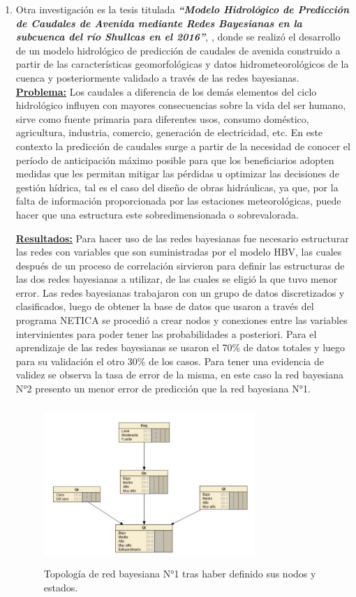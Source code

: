 \documentclass[10pt,conference]{IEEEtran}
\begin{document}
\begin{enumerate}
\item Otra investigación es la tesis titulada \textit{\textbf{“Modelo Hidrológico de Predicción de Caudales de Avenida mediante Redes Bayesianas en la subcuenca del río Shullcas en el 2016”}}, \citep{gonzales2021modelo}, donde se realizó el desarrollo de un modelo hidrológico de predicción
de caudales de avenida construido a partir de las características geomorfológicas y datos hidrometeorológicos de la cuenca y posteriormente validado a través de las redes bayesianas.
\textbf{\underline{Problema:}}
Los caudales a diferencia de los demás elementos del ciclo hidrológico influyen con mayores consecuencias sobre la vida del ser humano, sirve como fuente primaria para diferentes usos, consumo doméstico, agricultura, industria, comercio, generación de electricidad, etc.
En este contexto la predicción de caudales surge a partir de la necesidad de conocer el período de anticipación máximo posible para que los beneficiarios adopten medidas que les permitan mitigar las pérdidas u optimizar las decisiones de gestión hídrica, tal es el caso del diseño de obras hidráulicas, ya que, por la falta de información proporcionada por las estaciones meteorológicas, puede hacer que una estructura este sobredimensionada o sobrevalorada.\par
\textbf{\underline{Resultados:}}
Para hacer uso de las redes bayesianas fue necesario estructurar las redes con variables que son suministradas por el modelo HBV, las cuales después de un proceso de correlación sirvieron para definir las estructuras de las dos redes bayesianas a utilizar, de las cuales se eligió la que tuvo menor error. Las redes bayesianas trabajaron con un grupo de datos discretizados y clasificados, luego de obtener la base de datos que usaron a través del programa NETICA se procedió a crear nodos y conexiones entre las variables intervinientes para poder tener las probabilidades a posteriori. Para el aprendizaje de las redes bayesianas se usaron el 70\% de datos totales y luego para su validación el otro 30\% de los casos. Para tener una evidencia de validez se observa la tasa de error de la misma, en este caso la red bayesiana N°2 presento un menor error de predicción que la red bayesiana N°1.
\par
\begin{figure}[H]
\begin{center}
\includegraphics[width=8cm, height=6cm]{figuras/R34.JPG}
\caption{Topología de red bayesiana N°1 tras haber definido sus nodos y estados.}
\label{R34} 
\end{center}
\end{figure}


\end{enumerate}
\end{document}
